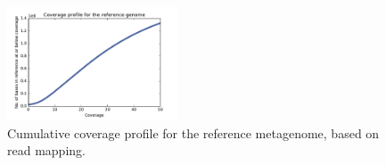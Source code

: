 \documentclass[10pt,a4paper,twocolumn]{article}
\begin{document}



 

 
\begin{figure}[!h]
\centering
\includegraphics[width=0.45\textwidth]{CoverageProfile.pdf}  
\caption{\label{fig:coverage-profile} Cumulative coverage profile for the reference metagenome, based on read mapping. }
\end{figure}


\end{document}
